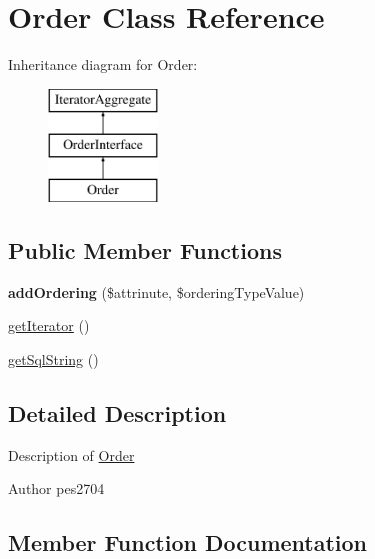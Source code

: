 \hypertarget{class_pes_1_1_query_1_1_order}{}\section{Order Class Reference}
\label{class_pes_1_1_query_1_1_order}
Inheritance diagram for Order\+:\begin{figure}[H]
\begin{center}
\leavevmode
\includegraphics[height=3.000000cm]{class_pes_1_1_query_1_1_order}
\end{center}
\end{figure}
\subsection*{Public Member Functions}
\begin{DoxyCompactItemize}
\item 
\mbox{\label{class_pes_1_1_query_1_1_order_a79768d92ba8c4948c860397f547e87b8}} 
{\bfseries add\+Ordering} (\$attrinute, \$ordering\+Type\+Value)
\item 
\mbox{\hyperlink{class_pes_1_1_query_1_1_order_a7a9f937c2958e6f4dd7b030f86fb70b7}{get\+Iterator}} ()
\item 
\mbox{\hyperlink{class_pes_1_1_query_1_1_order_a60f88a13135803a03975ff6555ece43f}{get\+Sql\+String}} ()
\end{DoxyCompactItemize}


\subsection{Detailed Description}
Description of \mbox{\hyperlink{class_pes_1_1_query_1_1_order}{Order}}

\begin{DoxyAuthor}{Author}
pes2704 
\end{DoxyAuthor}


\subsection{Member Function Documentation}
\mbox{\label{class_pes_1_1_query_1_1_order_a7a9f937c2958e6f4dd7b030f86fb70b7}} 
